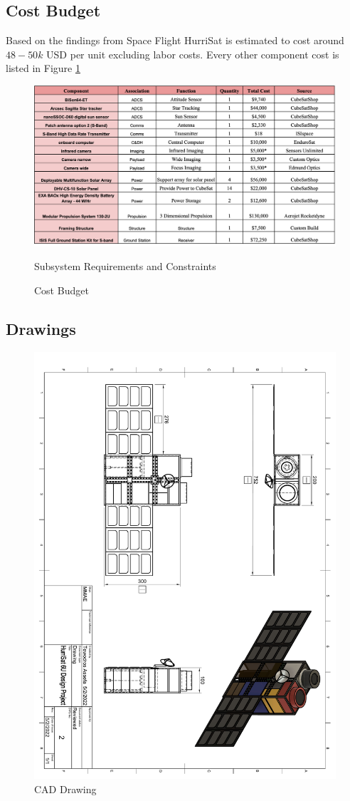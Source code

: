 
\subsection{Cost Budget}
Based on the findings from Space Flight \cite{SpaceFlight} HurriSat is estimated to cost around $48-50k$ USD per unit  excluding labor costs. Every other component cost is listed in Figure \ref{fig:cost}\\
\FloatBarrier
\begin{figure}[hbt!]
    \centering
    \includegraphics[width=\textwidth, frame]{Images/cost.png}
    \caption{Subsystem Requirements and Constraints}
    \label{fig:cost}
    \caption{Cost Budget}
\end{figure}

\subsection{Drawings }
\begin{figure}[hbt!]
    \centering
    \includegraphics[width=\textwidth,frame, keepaspectratio]{Images/CAD.pdf}
    \caption{CAD Drawing}
    \label{fig:cad}
\end{figure}